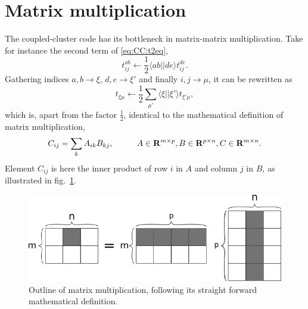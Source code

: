 \section{Matrix multiplication}
\label{sec:OpenCL:matmult}
The coupled-cluster code has its bottleneck in matrix-matrix multiplication.
Take for instance the second term of \eqref{eq:CC:t2eq},
\begin{equation}
t_{ij}^{ab} \leftarrow \frac{1}{2} \langle ab||de \rangle t^{de}_{ij} .
\end{equation}
Gathering indices $a,b \rightarrow \xi$, $d,e \rightarrow \xi'$ and finally $i,j \rightarrow \mu$, it can be rewritten as
\begin{equation}
t_{\xi \mu} \leftarrow \frac{1}{2} \sum_{\mu'} \langle \xi||\xi' \rangle t_{\xi' \mu} ,
\end{equation}
which is, apart from the factor $\frac{1}{2}$, identical to the mathematical definition of matrix multiplication,
\begin{equation}
\label{eq:OpenCL:matmult_def}
C_{ij} = \sum_k A_{ik} B_{kj},
\hspace{10mm}
A \in \mathbf{R}^{m\times p}, B \in \mathbf{R}^{p\times n}, C \in \mathbf{R}^{m\times n}.
\end{equation}
Element $C_{ij}$ is here the inner product of row $i$ in $A$ and column $j$ in $B$, as illustrated in fig.~\ref{fig:OpenCL:matmult}.
\begin{figure}
\begin{center}
\includegraphics[scale=0.5]{../08-OpenCL/figs/matmult.png}
\caption{Outline of matrix multiplication, following its straight forward mathematical definition.}
\label{fig:OpenCL:matmult}
\end{center}
\end{figure}

